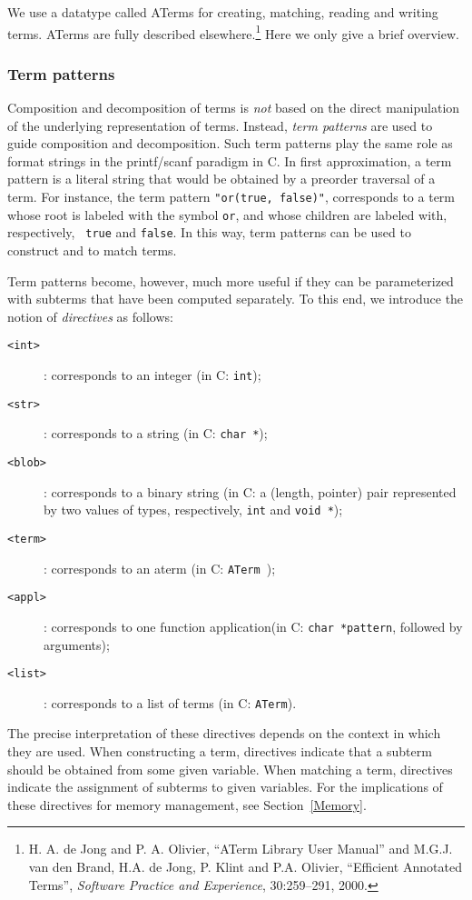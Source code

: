 \documentclass[twoside]{article} %
\begin{document}
We use a datatype called ATerms for creating, matching, reading and
writing terms. ATerms are fully described elsewhere.\footnote{H. A. de
Jong and P. A. Olivier, ``ATerm Library User Manual'' and M.G.J. van
den Brand, H.A. de Jong, P. Klint and P.A. Olivier, ``Efficient
Annotated Terms'', \emph{Software Practice and Experience},
30:259--291, 2000.}  Here we only give a brief overview.


\subsubsection{\label{Patterns}Term patterns}
Composition and decomposition of terms is {\em not} based on the
direct manipulation of the underlying representation of terms.
Instead, {\em term patterns} are used to guide composition and
decomposition.  Such term patterns play the same role as format
strings in the printf/scanf paradigm in C.  In first approximation, a
term pattern is a literal string that would be obtained by a preorder
traversal of a term.  For instance, the term pattern {\tt "or(true,
false)"}, corresponds to a term whose root is labeled with the symbol
{\tt or}, and whose children are labeled with, respectively, {\tt
true} and {\tt false}. In this way, term patterns can be used to
construct and to match terms.

Term patterns become, however, much more useful if they can be parameterized
with subterms that have been computed separately.
To this end, we introduce the notion of {\em directives} as follows:

\begin{description}
\item[{\tt <int>}]: corresponds to an integer (in C: {\tt int});
\item[{\tt <str>}]: corresponds to a string (in C: {\tt char *});
\item[{\tt <blob>}]: corresponds to a binary string (in C: a (length, pointer) pair 
represented by two values of types, respectively, {\tt int} and {\tt void *});
\item[{\tt <term>}]: corresponds to an aterm (in C: {\tt ATerm });
\item[{\tt <appl>}]: corresponds to one function application(in C: {\tt char *pattern}, followed by arguments);
\item[{\tt <list>}]: corresponds to a list of terms (in C: {\tt ATerm}).
\end{description}

The precise interpretation of these directives depends on the context
in which they are used.  When constructing a term, directives indicate
that a subterm should be obtained from some given variable.  When
matching a term, directives indicate the assignment of subterms to
given variables.
For the implications of these directives for memory management,
see Section~\ref{Memory}.
\end{document}
